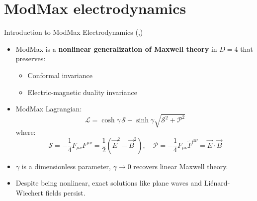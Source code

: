 \section{ModMax electrodynamics}

\begin{frame}[allowframebreaks]{Introduction to ModMax Electrodynamics (\cite{born1934foundations},\cite{rathi2023ads2})}
  \begin{itemize}
    \item ModMax is a \textbf{nonlinear generalization of Maxwell theory} in $D=4$ that preserves:
    \begin{itemize}
      \item Conformal invariance
      \item Electric-magnetic duality invariance
    \end{itemize}
    \item ModMax Lagrangian:
    \[
    \mathcal{L} = \cosh\gamma \, \mathcal{S} + \sinh\gamma \sqrt{\mathcal{S}^2 + \mathcal{P}^2}
    \]
    where:
    \[
    \mathcal{S} = -\frac{1}{4} F_{\mu\nu} F^{\mu\nu} = \frac{1}{2}(\vec{E}^2 - \vec{B}^2), \quad
    \mathcal{P} = -\frac{1}{4} F_{\mu\nu} \widetilde{F}^{\mu\nu} = \vec{E} \cdot \vec{B}
    \]
    \item $\gamma$ is a dimensionless parameter, $\gamma \to 0$ recovers linear Maxwell theory.
    \item Despite being nonlinear, exact solutions like plane waves and Liénard-Wiechert fields persist.
  \end{itemize}
\end{frame}

